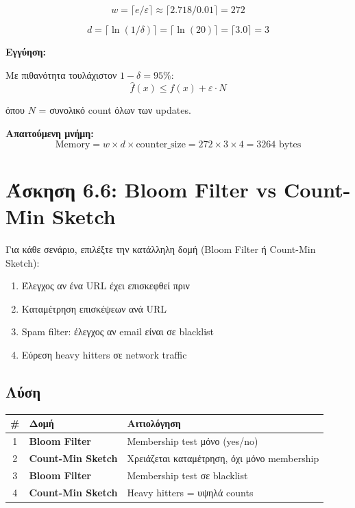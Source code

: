 $$w = \lceil e / \varepsilon \rceil \approx \lceil 2.718 / 0.01 \rceil = 272$$

$$d = \lceil \ln(1/\delta) \rceil = \lceil \ln(20) \rceil = \lceil 3.0 \rceil = 3$$

\textbf{Εγγύηση:}

Με πιθανότητα τουλάχιστον $1 - \delta = 95\%$:
$$\hat{f}(x) \leq f(x) + \varepsilon \cdot N$$

όπου $N$ = συνολικό count όλων των updates.

\textbf{Απαιτούμενη μνήμη:}
$$\text{Memory} = w \times d \times \text{counter\_size} = 272 \times 3 \times 4 = 3264 \text{ bytes}$$

\section{Άσκηση 6.6: Bloom Filter vs Count-Min Sketch}

\begin{formulabox}[Εκφώνηση]
Για κάθε σενάριο, επιλέξτε την κατάλληλη δομή (Bloom Filter ή Count-Min Sketch):

\begin{enumerate}
    \item Έλεγχος αν ένα URL έχει επισκεφθεί πριν
    \item Καταμέτρηση επισκέψεων ανά URL
    \item Spam filter: έλεγχος αν email είναι σε blacklist
    \item Εύρεση heavy hitters σε network traffic
\end{enumerate}
\end{formulabox}

\subsection*{Λύση}

\begin{center}
\begin{tabular}{clp{6cm}}
\toprule
\textbf{\#} & \textbf{Δομή} & \textbf{Αιτιολόγηση} \\
\midrule
1 & \textbf{Bloom Filter} & Membership test μόνο (yes/no) \\
2 & \textbf{Count-Min Sketch} & Χρειάζεται καταμέτρηση, όχι μόνο membership \\
3 & \textbf{Bloom Filter} & Membership test σε blacklist \\
4 & \textbf{Count-Min Sketch} & Heavy hitters = υψηλά counts \\
\bottomrule
\end{tabular}
\end{center}

